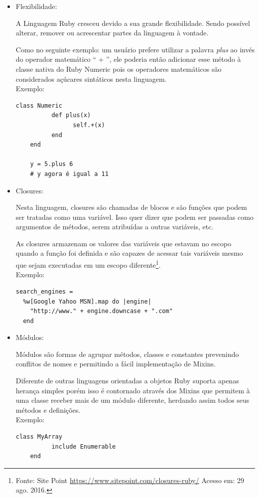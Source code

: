 \begin{itemize}
\item{Flexibilidade:}
    \par A Linguagem Ruby cresceu devido a sua grande flexibilidade. Sendo possível alterar, remover ou acrescentar partes da linguagem à vontade.
    \par Como no seguinte exemplo: um usuário prefere utilizar a palavra \emph{plus} ao invés do operador matemático `` + '', ele poderia então adicionar esse método à classe nativa do Ruby Numeric pois os operadores matemáticos são considerados açúcares sintáticos nesta linguagem.
\\Exemplo:
\begin{lstlisting}[frame=single]
class Numeric
          def plus(x)
                self.+(x)
          end
    end

    y = 5.plus 6
    # y agora é igual a 11
\end{lstlisting}
\item{Closures:}
\par Nesta linguagem, closures são chamadas de blocos e são funções que podem ser tratadas como uma variável. Isso quer dizer que podem ser passadas como argumentos de métodos, serem atribuídas a outras variáveis, etc.
\par As closures armazenam os valores das variáveis que estavam no escopo quando a função foi definida e são capazes de acessar tais variáveis mesmo que sejam executadas em um escopo diferente\footnote{Fonte: Site Point \url{https://www.sitepoint.com/closures-ruby/} Acesso em: 29 ago. 2016.}.
\\
Exemplo:
\begin{lstlisting}[frame=single]
search_engines =
  %w[Google Yahoo MSN].map do |engine|
    "http://www." + engine.downcase + ".com"
  end
\end{lstlisting}
\item{Módulos:}
\par Módulos são formas de agrupar métodos, classes e constantes prevenindo conflitos de nomes e permitindo a fácil implementação de Mixins.
\par Diferente de outras linguagens orientadas a objetos Ruby suporta apenas herança simples porém isso é contornado através dos Mixins que permitem à uma classe receber mais de um módulo diferente, herdando assim todos seus métodos e definições.
\\Exemplo:
\begin{lstlisting}[frame=single]
class MyArray
          include Enumerable
    end
\end{lstlisting}

\end{itemize}
